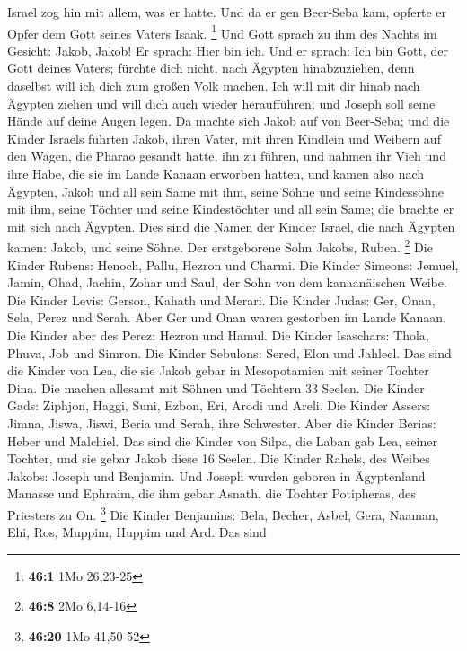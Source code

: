  Israel zog hin mit allem, was er hatte. Und da er gen
Beer-Seba kam, opferte er Opfer dem Gott seines Vaters Isaak.
\footnote{\textbf{46:1} 1Mo 26,23-25}  Und Gott sprach zu
ihm des Nachts im Gesicht: Jakob, Jakob! Er sprach: Hier bin ich.
 Und er sprach: Ich bin Gott, der Gott deines Vaters;
fürchte dich nicht, nach Ägypten hinabzuziehen, denn daselbst will ich
dich zum großen Volk machen.  Ich will mit dir hinab nach
Ägypten ziehen und will dich auch wieder heraufführen; und Joseph soll
seine Hände auf deine Augen legen.  Da machte sich Jakob auf
von Beer-Seba; und die Kinder Israels führten Jakob, ihren Vater, mit
ihren Kindlein und Weibern auf den Wagen, die Pharao gesandt hatte, ihn
zu führen,  und nahmen ihr Vieh und ihre Habe, die sie im
Lande Kanaan erworben hatten, und kamen also nach Ägypten, Jakob und all
sein Same mit ihm,  seine Söhne und seine Kindessöhne mit
ihm, seine Töchter und seine Kindestöchter und all sein Same; die
brachte er mit sich nach Ägypten.  Dies sind die Namen der
Kinder Israel, die nach Ägypten kamen: Jakob, und seine Söhne. Der
erstgeborene Sohn Jakobs, Ruben. \footnote{\textbf{46:8} 2Mo 6,14-16}
 Die Kinder Rubens: Henoch, Pallu, Hezron und Charmi.
 Die Kinder Simeons: Jemuel, Jamin, Ohad, Jachin, Zohar und
Saul, der Sohn von dem kanaanäischen Weibe.  Die Kinder
Levis: Gerson, Kahath und Merari.  Die Kinder Judas: Ger,
Onan, Sela, Perez und Serah. Aber Ger und Onan waren gestorben im Lande
Kanaan. Die Kinder aber des Perez: Hezron und Hamul.  Die
Kinder Isaschars: Thola, Phuva, Job und Simron.  Die Kinder
Sebulons: Sered, Elon und Jahleel.  Das sind die Kinder von
Lea, die sie Jakob gebar in Mesopotamien mit seiner Tochter Dina. Die
machen allesamt mit Söhnen und Töchtern 33 Seelen.  Die
Kinder Gads: Ziphjon, Haggi, Suni, Ezbon, Eri, Arodi und Areli.
 Die Kinder Assers: Jimna, Jiswa, Jiswi, Beria und Serah,
ihre Schwester. Aber die Kinder Berias: Heber und Malchiel.
 Das sind die Kinder von Silpa, die Laban gab Lea, seiner
Tochter, und sie gebar Jakob diese 16 Seelen.  Die Kinder
Rahels, des Weibes Jakobs: Joseph und Benjamin.  Und Joseph
wurden geboren in Ägyptenland Manasse und Ephraim, die ihm gebar Asnath,
die Tochter Potipheras, des Priesters zu On. \footnote{\textbf{46:20}
  1Mo 41,50-52}  Die Kinder Benjamins: Bela, Becher, Asbel,
Gera, Naaman, Ehi, Ros, Muppim, Huppim und Ard.  Das sind
